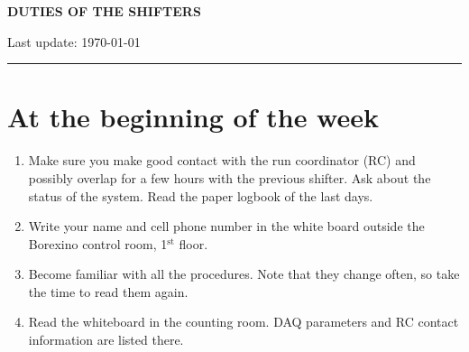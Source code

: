 \documentclass[a4paper,11pt]{article}
\begin{document}
\centerline{\textbf{\LARGE{\color{black}DUTIES OF THE SHIFTERS}}}
\begin{table}[!h]
 \begin{flushright}
   \small{Last update: \today}
 \end{flushright}
\rule{\linewidth}{0.07mm}
\end{table}

\section*{At the beginning of the week}
\begin{enumerate}
\item Make sure you make good contact with the run coordinator (RC) and possibly overlap for a few hours 
with the previous shifter. Ask about the status of the system. Read the paper logbook of the last days.

\item Write your name and cell phone number in the white board outside the Borexino control room, 1$\mathrm{^{st}}$ floor.

\item Become familiar with all the procedures. Note that they change often, so take the time to read them again.

\item Read the whiteboard in the counting room. DAQ parameters and RC contact information are listed there.
\end{enumerate}
\end{document}

